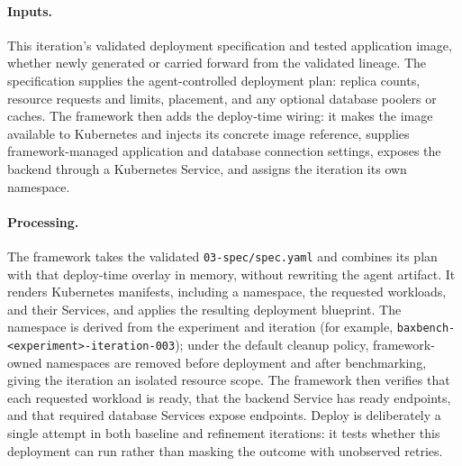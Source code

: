 \paragraph{Inputs.}
This iteration's validated deployment specification and tested application
image, whether newly generated or carried forward from the validated
lineage. The specification supplies the agent-controlled deployment plan:
replica counts, resource requests and limits, placement, and any optional
database poolers or caches. The framework then adds the deploy-time wiring:
it makes the image available to Kubernetes and injects its concrete image
reference, supplies framework-managed application and database connection
settings, exposes the backend through a Kubernetes Service, and assigns the
iteration its own namespace.

\paragraph{Processing.}
The framework takes the validated \texttt{03-spec/spec.yaml} and combines
its plan with that deploy-time overlay in memory, without rewriting the
agent artifact. It renders Kubernetes manifests, including a namespace, the
requested workloads, and their Services, and applies the resulting
deployment blueprint. The namespace is derived from the experiment and
iteration (for example, \texttt{baxbench-<experiment>-iteration-003}); under
the default cleanup policy, framework-owned namespaces are removed before
deployment and after benchmarking, giving the iteration an isolated
resource scope. The framework then verifies that each
requested workload is ready, that the backend Service has ready endpoints,
and that required database Services expose endpoints. Deploy is deliberately
a single attempt in both baseline and refinement iterations: it tests
whether this deployment can run rather than masking the outcome with
unobserved retries.

